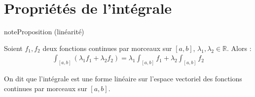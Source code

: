 \documentclass[letterpaper,10pt,french]{sphinxmanual}
\begin{document}
\section{Propriétés de l’intégrale}
\label{\detokenize{pptint:proprietes-de-l-integrale}}\label{\detokenize{pptint::doc}}
\begin{sphinxadmonition}{note}{Proposition (linéarité)}

\sphinxAtStartPar
Soient \(f_1, f_2\) deux fonctions continues par morceaux sur \([a, b]\), \(\lambda_1, \lambda_2 \in \mathbb R\). Alors :
\begin{equation*}
\begin{split}
\int_{[a, b]} (\lambda_1f_1 + \lambda_2f_2) = \lambda_1 \int_{[a, b]} f_1 + \lambda_2 \int_{[a, b]} f_2
\end{split}
\end{equation*}\end{sphinxadmonition}

\sphinxAtStartPar
On dit que l’intégrale est une forme linéaire sur l’espace vectoriel des fonctions continues par morceaux sur \([a, b]\).
\end{document}
